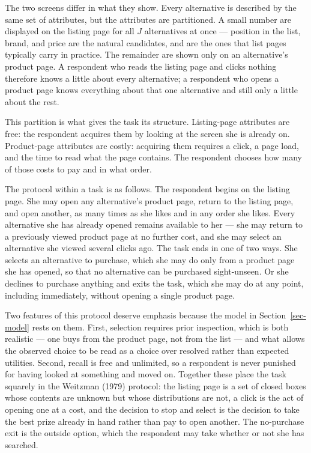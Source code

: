 \documentclass[
  letterpaper,
  DIV=11,
  numbers=noendperiod]{scrartcl}
\begin{document}
The two screens differ in what they show. Every alternative is described
by the same set of attributes, but the attributes are partitioned. A
small number are displayed on the listing page for all \(J\)
alternatives at once --- position in the list, brand, and price are the
natural candidates, and are the ones that list pages typically carry in
practice. The remainder are shown only on an alternative's product page.
A respondent who reads the listing page and clicks nothing therefore
knows a little about every alternative; a respondent who opens a product
page knows everything about that one alternative and still only a little
about the rest.

This partition is what gives the task its structure. Listing-page
attributes are free: the respondent acquires them by looking at the
screen she is already on. Product-page attributes are costly: acquiring
them requires a click, a page load, and the time to read what the page
contains. The respondent chooses how many of those costs to pay and in
what order.

The protocol within a task is as follows. The respondent begins on the
listing page. She may open any alternative's product page, return to the
listing page, and open another, as many times as she likes and in any
order she likes. Every alternative she has already opened remains
available to her --- she may return to a previously viewed product page
at no further cost, and she may select an alternative she viewed several
clicks ago. The task ends in one of two ways. She selects an alternative
to purchase, which she may do only from a product page she has opened,
so that no alternative can be purchased sight-unseen. Or she declines to
purchase anything and exits the task, which she may do at any point,
including immediately, without opening a single product page.

Two features of this protocol deserve emphasis because the model in
Section~\ref{sec-model} rests on them. First, selection requires prior
inspection, which is both realistic --- one buys from the product page,
not from the list --- and what allows the observed choice to be read as
a choice over resolved rather than expected utilities. Second, recall is
free and unlimited, so a respondent is never punished for having looked
at something and moved on. Together these place the task squarely in the
Weitzman (1979) protocol: the listing page is a set of closed boxes
whose contents are unknown but whose distributions are not, a click is
the act of opening one at a cost, and the decision to stop and select is
the decision to take the best prize already in hand rather than pay to
open another. The no-purchase exit is the outside option, which the
respondent may take whether or not she has searched.
\end{document}
